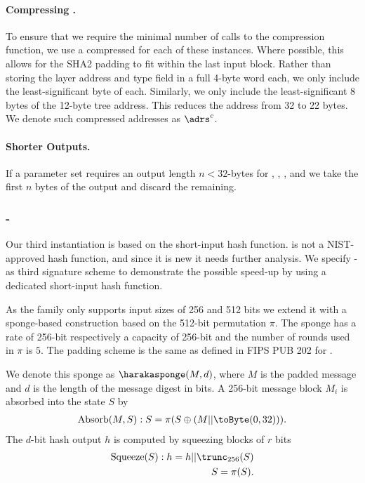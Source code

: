    \paragraph{Compressing \adrs.} To ensure that we require the minimal number of calls to the \shatwo compression function, we use a compressed \adrs for each of these instances. Where possible, this allows for the SHA2 padding to fit within the last input block. Rather than storing the layer address and type field in a full 4-byte word each, we only include the least-significant byte of each. Similarly, we only include the least-significant 8 bytes of the 12-byte tree address. This reduces the address from 32 to 22 bytes. We denote such compressed addresses as $\adrs^{c}$.

   \paragraph{Shorter Outputs.} If a parameter set requires an 
   output length $n < 32$-bytes for \sphincsF, \sphincsH, \sphincsPRF, and 
   \sphincsPRFmsg we take the first $n$ bytes of the output and discard the 
   remaining.

\subsubsection{\spx-\haraka}
   Our third instantiation is based on the \haraka short-input hash function. 
   \haraka is not a NIST-approved hash function,
   and since it is new it needs further analysis.
   We specify \spx-\haraka as
   third signature scheme to demonstrate the possible speed-up by using a 
   dedicated short-input hash function.
   
   As
   the \haraka family only supports input sizes of 256 and 512 bits we extend it
   with a sponge-based construction based on the 512-bit permutation $\pi$. The 
   sponge has a rate of 256-bit respectively a capacity of 256-bit and the 
   number of rounds used in $\pi$ is $5$. The padding scheme is the same as 
   defined in FIPS PUB 202 for \shathree.

   We denote this sponge as $\harakasponge(M, d)$, where $M$ is the padded
   message and $d$ is the length of the message digest in bits. A 256-bit 
   message block $M_i$ is absorbed into the state $S$ by
   \begin{equation}
      \begin{aligned}
      \text{Absorb}(M, S): S = \pi(S \oplus (M || \toByte(0, 32))).
      \end{aligned}
   \end{equation}
   The $d$-bit hash output $h$ is computed by squeezing blocks of $r$ bits
   \begin{equation}
      \begin{aligned}
      \text{Squeeze}(S): h = h || \trunc_{256}(S)\\
                         S = \pi(S).
      \end{aligned}
   \end{equation}
   

